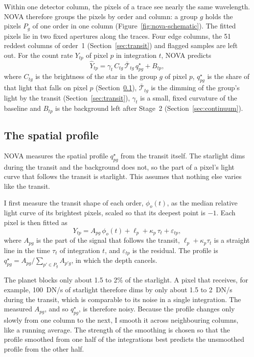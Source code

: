 Within one detector column, the pixels of a trace see nearly the same
wavelength. NOVA therefore groups the pixels by order and column: a group $g$
holds the pixels $P_g$ of one order in one column
(Figure~\ref{fig:nova-schematic}). The fitted pixels lie in two fixed
apertures along the traces. Four edge columns, the 51 reddest columns of
order~1 (Section~\ref{sec:transit}) and flagged samples are left out. For the count rate $Y_{tp}$ of pixel
$p$ in integration $t$, NOVA predicts
\begin{equation}
 \widehat Y_{tp}
 = \gamma_t\, C_{tg}\, \bar{\mathcal{T}}_{tg}\, q^\star_{pg} + B_{tp},
 \label{eq:nova-forward}
\end{equation}
where $C_{tg}$ is the brightness of the star in the group $g$ of pixel $p$,
$q^\star_{pg}$ is the share of that light that falls on pixel $p$
(Section~\ref{sec:response}), $\bar{\mathcal{T}}_{tg}$ is the dimming of
the group's light by the transit (Section~\ref{sec:transit}), $\gamma_t$ is a small,
fixed curvature of the baseline and $B_{tp}$ is the background left after
Stage~2 (Section~\ref{sec:continuum}).

\subsection{The spatial profile}
\label{sec:response}

NOVA measures the spatial profile $q^\star_{pg}$ from the transit itself. The
starlight dims during the transit and the background does not, so the part of
a pixel's light curve that follows the transit is starlight. This assumes that
nothing else varies like the transit.

I first measure the transit shape of each order, $\phi_o(t)$, as the median
relative light curve of its brightest pixels, scaled so that its deepest point
is $-1$. Each pixel is then fitted as
\begin{equation}
 Y_{tp} = A_{pg}\,\phi_{o}(t) + \ell_p + \kappa_p\,\tau_t + \varepsilon_{tp},
 \label{eq:qstar-fit}
\end{equation}
where $A_{pg}$ is the part of the signal that follows the transit,
$\ell_p+\kappa_p\tau_t$ is a straight line in the time $\tau_t$ of integration
$t$, and $\varepsilon_{tp}$ is the residual. The profile is $q^\star_{pg}=A_{pg}/\sum_{p'\in P_g}A_{p'g}$, in
which the depth cancels.

The planet blocks only about 1.5 to 2\% of the starlight. A pixel that
receives, for example, 100~DN/s of starlight therefore dims by only about 1.5
to 2~DN/s during the transit, which is comparable to its noise in a single
integration. The measured $A_{pg}$, and so $q^\star_{pg}$, is therefore
noisy. Because the profile changes only slowly from one column to the next, I
smooth it across neighbouring columns, like a running average. The strength of
the smoothing is chosen so that the profile smoothed from one half of the
integrations best predicts the unsmoothed profile from the other half.

